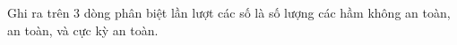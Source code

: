 Ghi ra trên 3 dòng phân biệt lần lượt các số là số lượng các hầm không an toàn, an toàn, và cực kỳ an toàn.